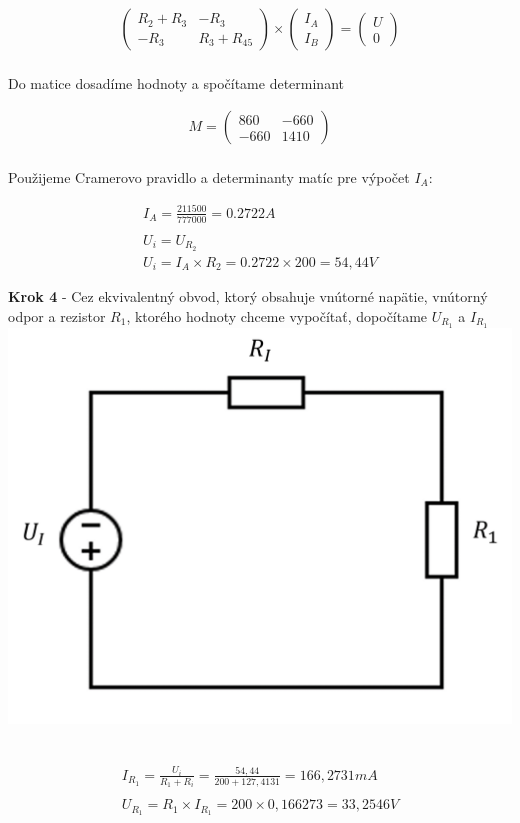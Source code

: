 \begin{gather*}
    \begin{pmatrix}
    R_2 + R_3 & -R_3 \\
    -R_3 & R_3 + R_{45}
    \end{pmatrix}
    \times
    \begin{pmatrix}
    I_A \\
    I_B
    \end{pmatrix}
    =
    \begin{pmatrix}
    U \\
    0
    \end{pmatrix}
\end{gather*}
\\

Do matice dosadíme hodnoty a spočítame determinant

\begin{gather*}
    M =
    \begin{pmatrix}
    860 & -660 \\
    -660 & 1410
    \end{pmatrix}
\end{gather*}
\\

Použijeme Cramerovo pravidlo a determinanty matíc pre výpočet $I_A$:

\begin{gather*}
    I_A = \frac{211500}{777000} = 0.2722 A
    \\\\
    U_i = U_{R_2} \\
   U_i = I_A \times R_2 = 0.2722 \times 200 = 54,44 V
\end{gather*}

\begin{center}
    \textbf{Krok 4} - Cez ekvivalentný obvod, ktorý obsahuje vnútorné napätie, vnútorný odpor a rezistor $R_1$, ktorého hodnoty chceme vypočítať, dopočítame $U_{R_1}$ a $I_{R_1}$ \\
    \includegraphics[scale=0.5,keepaspectratio]{fig/pr2_3.png} \
\end{center}

\begin{gather*}
    I_{R_{1}} = \frac {U_{i}} {R_{1} + R_{i}} = \frac {54,44} { 200 + 127,4131} = 166,2731 mA \\\\
    U_{R_{1}} = R_1 \times  I_{R_{1}} = 200 \times 0,166273 = 33,2546 V \\
\end{gather*}

